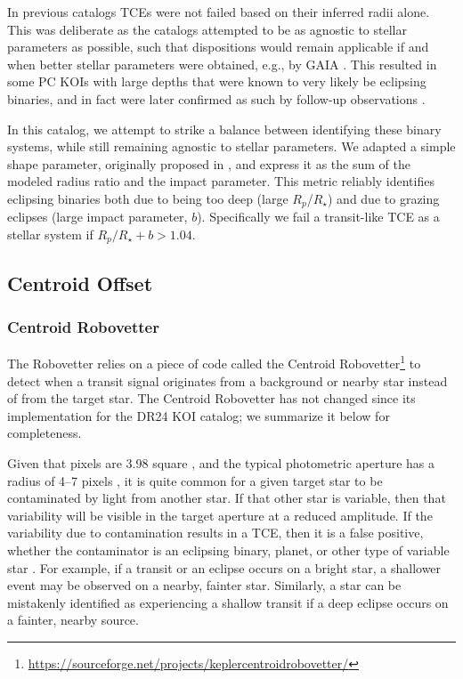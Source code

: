 In previous catalogs \citep{Rowe2015cat,Mullally2015cat,Coughlin2016} TCEs were not failed based on their inferred radii alone. This was deliberate as the catalogs attempted to be as agnostic to stellar parameters as possible, such that dispositions would remain applicable if and when better stellar parameters were obtained, e.g., by GAIA \citep{Cacciari2009,Mignard2005}. This resulted in some PC KOIs with large depths that were known to very likely be eclipsing binaries, and in fact were later confirmed as such by follow-up observations \citep{Santerne2016}.

In this catalog, we attempt to strike a balance between identifying these binary systems, while still remaining agnostic to stellar parameters. We adapted a simple shape parameter, originally proposed in \citet{Batalha2013}, and express it as the sum of the modeled radius ratio and the impact parameter. This metric reliably identifies eclipsing binaries both due to being too deep (large $R_{p}$/$R_{\star}$) and due to grazing eclipses (large impact parameter, $b$). Specifically we fail a transit-like TCE as a stellar system if $R_{p}/R_{\star} + b >1.04$.



\subsection{Centroid Offset}
\subsubsection{Centroid Robovetter}
\label{s:centroidrv}
The Robovetter relies on a piece of code called the Centroid Robovetter\footnote{\url{https://sourceforge.net/projects/keplercentroidrobovetter/}} \citep{Mullally2017} to detect when a transit signal originates from a background or nearby star instead of from the target star. The Centroid Robovetter has not changed since its implementation for the DR24 KOI catalog; we summarize it below for completeness. 

Given that  pixels are 3.98\arcsec{} square \citep{Koch2010}, and the typical photometric aperture has a radius of 4--7 pixels \citep{Bryson2010b}, it is quite common for a given target star to be contaminated by light from another star. If that other star is variable, then that variability will be visible in the target aperture at a reduced amplitude. If the variability due to contamination results in a TCE, then it is a false positive, whether the contaminator is an eclipsing binary, planet, or other type of variable star \citep{Bryson2013}. For example, if a transit or an eclipse occurs on a bright star, a shallower event may be observed on a nearby, fainter star. Similarly, a star can be mistakenly identified as experiencing a shallow transit if a deep eclipse occurs on a fainter, nearby source.

